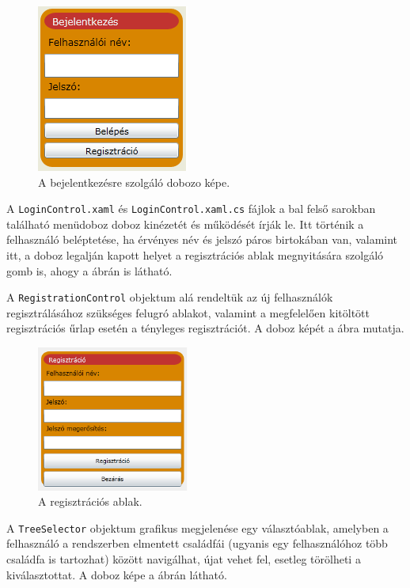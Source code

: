 \bigskip

\begin{figure}[!ht]
\centering
\includegraphics[width=50mm, keepaspectratio]{figures/login.png}
\caption{A bejelentkezésre szolgáló dobozo képe.}
\label{fig:alk_login}
\end{figure}

A \texttt{LoginControl.xaml} és \texttt{LoginControl.xaml.cs} fájlok a bal felső sarokban található menüdoboz doboz kinézetét és működését írják le. Itt történik a felhasználó beléptetése, ha érvényes név és jelszó páros birtokában van, valamint itt, a doboz legalján kapott helyet a regisztrációs ablak megnyitására szolgáló gomb is, ahogy a  ábrán is látható.

\bigskip

A \texttt{RegistrationControl} objektum alá rendeltük az új felhasználók regisztrálásához szükséges felugró ablakot, valamint a megfelelően kitöltött regisztrációs űrlap esetén a tényleges regisztrációt. A doboz képét a  ábra mutatja.

\begin{figure}[!ht]
\centering
\includegraphics[width=50mm, keepaspectratio]{figures/register.png}
\caption{A regisztrációs ablak.}
\label{fig:alk_register}
\end{figure}

\bigskip

A \texttt{TreeSelector} objektum grafikus megjelenése egy választóablak, amelyben a felhasználó a rendszerben elmentett családfái (ugyanis egy felhasználóhoz több családfa is tartozhat) között navigálhat, újat vehet fel, esetleg törölheti a kiválasztottat. A doboz képe a  ábrán látható.

